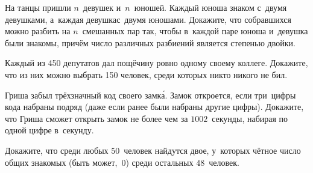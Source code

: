 \documentclass[a4paper,12pt]{article}
\begin{document}
На танцы пришли $n$~девушек и~$n$~юношей. Каждый юноша знаком с~двумя девушками, а~каждая девушка\т с~двумя юношами. Докажите, что собравшихся можно разбить на $n$~смешанных пар так, чтобы в~каждой паре юноша и~девушка были знакомы, причём число различных разбиений является степенью двойки.

Каждый из 450 депутатов дал пощёчину ровно одному своему коллеге. Докажите, что из них можно выбрать 150 человек,  среди которых никто никого не бил.

Гриша забыл трёхзначный код своего замк\'а. Замок откроется, если три~цифры кода набраны подряд (даже если ранее были набраны другие цифры). Докажите, что Гриша сможет открыть замок не более чем за $1002$~секунды, набирая по одной цифре в~секунду.

Докажите, что среди любых $50$~человек найдутся двое, у~которых чётное число общих знакомых (быть может,~$0$) среди остальных $48$~человек.


\vfill
{}

\end{document}
